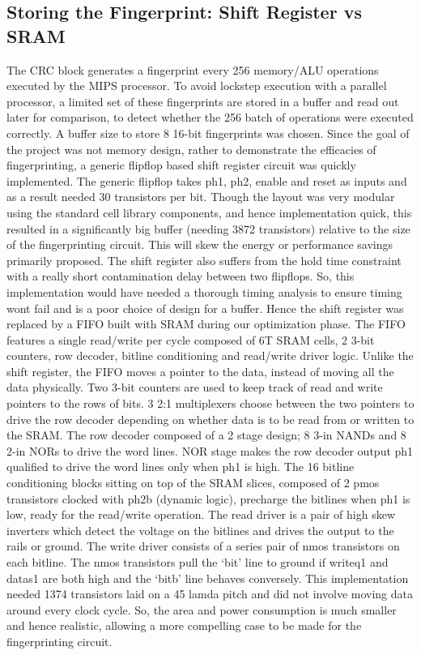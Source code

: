 \documentclass[10pt,journal,compsoc]{IEEEtran}
\begin{document}
\subsection{Storing the Fingerprint: Shift Register vs SRAM}
The CRC block generates a fingerprint every 256 memory/ALU operations executed by the MIPS processor. To avoid lockstep execution with a parallel processor, a limited set of these fingerprints are stored in a buffer and read out later for comparison, to detect whether the 256 batch of operations were executed correctly. A buffer size to store 8 16-bit fingerprints was chosen. Since the goal of the project was not memory design, rather to demonstrate the efficacies of fingerprinting, a generic flipflop based shift register circuit was quickly implemented. The generic flipflop takes ph1, ph2, enable and reset as inputs and as a result needed 30 transistors per bit. Though the layout was very modular using the standard cell library components, and hence implementation quick, this resulted in a significantly big buffer (needing 3872 transistors) relative to the size of the fingerprinting circuit. This will skew the energy or performance savings primarily proposed. The shift register also suffers from the hold time constraint with a really short contamination delay between two flipflops. So, this implementation would have needed a thorough timing analysis to ensure timing wont fail and is a poor choice of design for a buffer. Hence the shift register was replaced by a FIFO built with SRAM during our optimization phase.
The FIFO features a single read/write per cycle composed of 6T SRAM cells, 2 3-bit counters, row decoder, bitline conditioning and read/write driver logic. Unlike the shift register, the FIFO moves a pointer to the data, instead of moving all the data physically. Two 3-bit counters are used to keep track of read and write pointers to the rows of bits. 3 2:1 multiplexers choose between the two pointers to drive the row decoder depending on whether data is to be read from or written to the SRAM. The row decoder composed of a 2 stage design; 8 3-in NANDs and 8 2-in NORs to drive the word lines. NOR stage makes the row decoder output ph1 qualified to drive the word lines only when ph1 is high. The 16 bitline conditioning blocks sitting on top of the SRAM slices, composed of 2 pmos transistors clocked with ph2b (dynamic logic), precharge the bitlines when ph1 is low, ready for the read/write operation. The read driver is a pair of high skew inverters which detect the voltage on the bitlines and drives the output to the rails or ground. The write driver consists of a series pair of nmos transistors on each bitline. The nmos transistors pull the ‘bit’ line to ground if writeq1 and datas1 are both high and the ‘bitb’ line behaves conversely.  
This implementation needed 1374 transistors laid on a 45 lamda pitch and did not involve moving data around every clock cycle. So, the area and power consumption is much smaller and hence realistic, allowing a more compelling case to be made for the fingerprinting circuit. 
\end{document}
